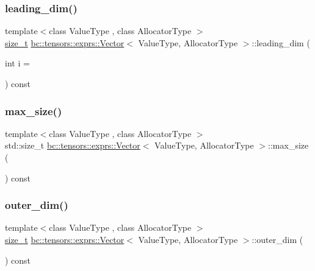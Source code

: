 \subsubsection{\texorpdfstring{leading\+\_\+dim()}{leading\_dim()}}
{\footnotesize\ttfamily template$<$class Value\+Type , class Allocator\+Type $>$ \\
\hyperlink{namespacebc_aaf8e3fbf99b04b1b57c4f80c6f55d3c5}{size\+\_\+t} \hyperlink{structbc_1_1tensors_1_1exprs_1_1Vector}{bc\+::tensors\+::exprs\+::\+Vector}$<$ Value\+Type, Allocator\+Type $>$\+::leading\+\_\+dim (\begin{DoxyParamCaption}\item[{int}]{i = {} }\end{DoxyParamCaption}) const\hspace{0.3cm}{\ttfamily [inline]}}

\mbox{\label{structbc_1_1tensors_1_1exprs_1_1Vector_aa2966322975b102857748f091090fea3}} 
\subsubsection{\texorpdfstring{max\+\_\+size()}{max\_size()}}
{\footnotesize\ttfamily template$<$class Value\+Type , class Allocator\+Type $>$ \\
std\+::size\+\_\+t \hyperlink{structbc_1_1tensors_1_1exprs_1_1Vector}{bc\+::tensors\+::exprs\+::\+Vector}$<$ Value\+Type, Allocator\+Type $>$\+::max\+\_\+size (\begin{DoxyParamCaption}{ }\end{DoxyParamCaption}) const\hspace{0.3cm}{\ttfamily [inline]}}

\mbox{\label{structbc_1_1tensors_1_1exprs_1_1Vector_a1bc72dcd2b0ab03a431d32d7df9c6e04}} 
\subsubsection{\texorpdfstring{outer\+\_\+dim()}{outer\_dim()}}
{\footnotesize\ttfamily template$<$class Value\+Type , class Allocator\+Type $>$ \\
\hyperlink{namespacebc_aaf8e3fbf99b04b1b57c4f80c6f55d3c5}{size\+\_\+t} \hyperlink{structbc_1_1tensors_1_1exprs_1_1Vector}{bc\+::tensors\+::exprs\+::\+Vector}$<$ Value\+Type, Allocator\+Type $>$\+::outer\+\_\+dim (\begin{DoxyParamCaption}{ }\end{DoxyParamCaption}) const\hspace{0.3cm}{\ttfamily [inline]}}


